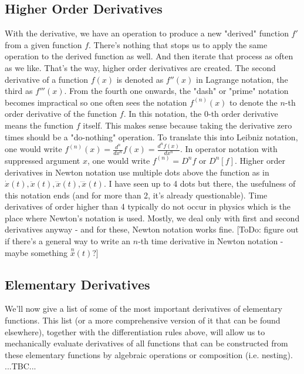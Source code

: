 \subsection{Higher Order Derivatives}
With the derivative, we have an operation to produce a new "derived" function $f'$ from a given function $f$. There's nothing that stops us to apply the same operation to the derived function as well. And then iterate that process as often as we like. That's the way, higher order derivatives are created. The second derivative of a function $f(x)$ is denoted as $f''(x)$ in Lagrange notation, the third as $f'''(x)$. From the fourth one onwards, the "dash" or "prime" notation becomes impractical so one often sees the notation $f^{(n)}(x)$ to denote the $n$-th order derivative of the function $f$. In this notation, the $0$-th order derivative means the function $f$ itself. This makes sense because taking the derivative zero times should be a "do-nothing" operation. To translate this into Leibniz notation, one would write $f^{(n)}(x) = \frac{d^n}{d x^n} f(x) = \frac{d^n f(x)}{d x^n}$. In operator notation with suppressed argument $x$, one would write $f^{(n)} = D^n f$ or $D^n[f]$. Higher order derivatives in Newton notation use multiple dots above the function as in $\dot{x}(t), \ddot{x}(t), \dddot{x}(t), \ddddot{x}(t)$. I have seen up to 4 dots but there, the usefulness of this notation ends (and for more than 2, it's already questionable). Time derivatives of order higher than 4 typically do not occur in physics which is the place where Newton's notation is used. Mostly, we deal only with first and second derivatives anyway - and for these, Newton notation works fine. [ToDo: figure out if there's a general way to write an $n$-th time derivative in Newton notation - maybe something $\overset{n}{x}(t)$?]








\subsection{Elementary Derivatives}
We'll now give a list of some of the most important derivatives of elementary functions. This list (or a more comprehensive version of it that can be found elsewhere), together with the differentiation rules above, will allow us to mechanically evaluate derivatives of all functions that can be constructed from these elementary functions by algebraic operations or composition (i.e. nesting). ...TBC...

